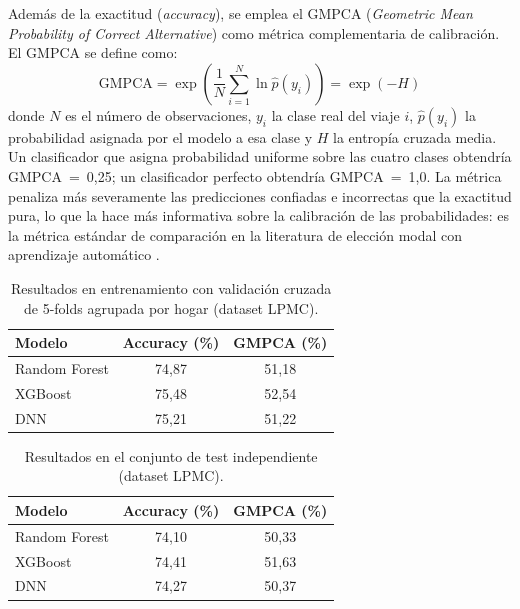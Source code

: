 Además de la exactitud (\textit{accuracy}), se emplea el GMPCA (\textit{Geometric Mean Probability of Correct Alternative}) como métrica complementaria de calibración. El GMPCA se define como:
\begin{equation}
  \label{eq:gmpca}
  \text{GMPCA} = \exp\!\left(\frac{1}{N}\sum_{i=1}^{N} \ln \hat{p}(y_i)\right) = \exp(-H)
\end{equation}
donde $N$ es el número de observaciones, $y_i$ la clase real del viaje $i$, $\hat{p}(y_i)$ la probabilidad asignada por el modelo a esa clase y $H$ la entropía cruzada media. Un clasificador que asigna probabilidad uniforme sobre las cuatro clases obtendría GMPCA~=~0,25; un clasificador perfecto obtendría GMPCA~=~1,0. La métrica penaliza más severamente las predicciones confiadas e incorrectas que la exactitud pura, lo que la hace más informativa sobre la calibración de las probabilidades: es la métrica estándar de comparación en la literatura de elección modal con aprendizaje automático \cite{MartinBaos2023TRC}.

\begin{table}[htbp]
  \caption{Resultados en entrenamiento con validación cruzada de 5-folds agrupada por hogar (dataset LPMC).}
  \label{tab:lpmc_train_results}
  \centering
  \begin{tabular}{lcc}
    \toprule
    \textbf{Modelo} & \textbf{Accuracy (\%)} & \textbf{GMPCA (\%)} \\
    \midrule
    Random Forest & 74,87 & 51,18 \\
    XGBoost       & 75,48 & 52,54 \\
    DNN           & 75,21 & 51,22 \\
    \bottomrule
  \end{tabular}
\end{table}

\begin{table}[htbp]
  \caption{Resultados en el conjunto de test independiente (dataset LPMC).}
  \label{tab:lpmc_test_results}
  \centering
  \begin{tabular}{lcc}
    \toprule
    \textbf{Modelo} & \textbf{Accuracy (\%)} & \textbf{GMPCA (\%)} \\
    \midrule
    Random Forest & 74,10 & 50,33 \\
    XGBoost       & 74,41 & 51,63 \\
    DNN           & 74,27 & 50,37 \\
    \bottomrule
  \end{tabular}
\end{table}

